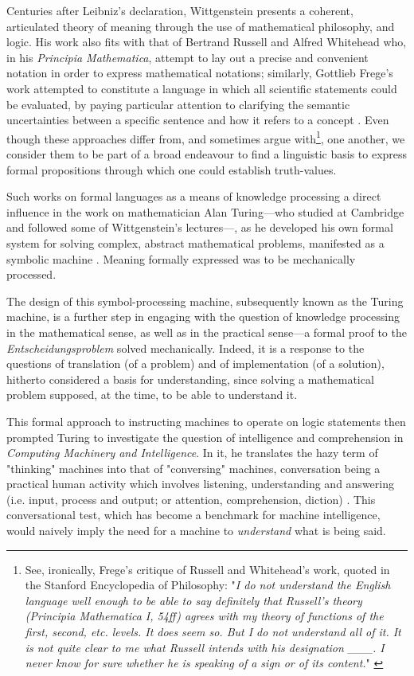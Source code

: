 Centuries after Leibniz's declaration, Wittgenstein presents a coherent, articulated theory of meaning through the use of mathematical philosophy, and logic. His work also fits with that of Bertrand Russell and Alfred Whitehead who, in his \emph{Principia Mathematica}, attempt to lay out a precise and convenient notation in order to express mathematical notations; similarly, Gottlieb Frege's work attempted to constitute a language in which all scientific statements could be evaluated, by paying particular attention to clarifying the semantic uncertainties between a specific sentence and how it refers to a concept \citep{korte_frege_2010}. Even though these approaches differ from, and sometimes argue with\footnote{See, ironically, Frege's critique of Russell and Whitehead's work, quoted in the Stanford Encyclopedia of Philosophy: "\emph{I do not understand the English language well enough to be able to say definitely that Russell's theory (Principia Mathematica I, 54ff) agrees with my theory of functions of the first, second, etc. levels. It does seem so. But I do not understand all of it. It is not quite clear to me what Russell intends with his designation ___. I never know for sure whether he is speaking of a sign or of its content.}" \citep{linsky_principia_2022}}, one another, we consider them to be part of a broad endeavour to find a linguistic basis to express formal propositions through which one could establish truth-values.


Such works on formal languages as a means of knowledge processing a direct influence in the work on mathematician Alan Turing—who studied at Cambridge and followed some of Wittgenstein's lectures—, as he developed his own formal system for solving complex, abstract mathematical problems, manifested as a symbolic machine \citep{turing_computable_1936}. Meaning formally expressed was to be mechanically processed.

The design of this symbol-processing machine, subsequently known as the Turing machine, is a further step in engaging with the question of knowledge processing in the mathematical sense, as well as in the practical sense—a formal proof to the \emph{Entscheidungsproblem} solved mechanically. Indeed, it is a response to the questions of translation (of a problem) and of implementation (of a solution), hitherto considered a basis for understanding, since solving a mathematical problem supposed, at the time, to be able to understand it.

This formal approach to instructing machines to operate on logic statements then prompted Turing to investigate the question of intelligence and comprehension in \emph{Computing Machinery and Intelligence}. In it, he translates the hazy term of "thinking" machines into that of "conversing" machines, conversation being a practical human activity which involves listening, understanding and answering (i.e. input, process and output; or attention, comprehension, diction) \citep{turing_computing_2009}. This conversational test, which has become a benchmark for machine intelligence, would naively imply the need for a machine to \emph{understand} what is being said.

